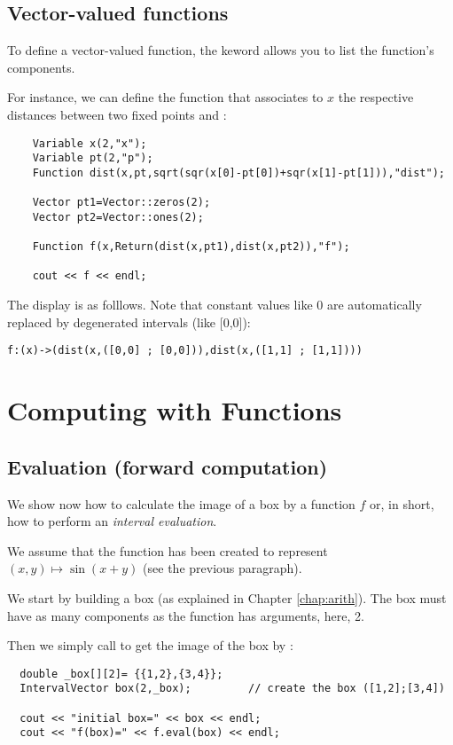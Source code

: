 \subsection{Vector-valued functions}

To define a vector-valued function, the  keword allows
you to list the function's components.

For instance, we can define the function that associates to $x$ the 
respective distances between two fixed points  and :

\begin{lstlisting}	
	Variable x(2,"x");
	Variable pt(2,"p");
	Function dist(x,pt,sqrt(sqr(x[0]-pt[0])+sqr(x[1]-pt[1])),"dist");

	Vector pt1=Vector::zeros(2);
	Vector pt2=Vector::ones(2);

	Function f(x,Return(dist(x,pt1),dist(x,pt2)),"f");

	cout << f << endl;
\end{lstlisting}

The display is as folllows. Note that constant values like 0 are automatically replaced
by degenerated intervals (like [0,0]):
\begin{verbatim}
f:(x)->(dist(x,([0,0] ; [0,0])),dist(x,([1,1] ; [1,1])))
\end{verbatim}

\section{Computing with Functions}

\subsection{Evaluation (forward computation)}

We show now how to calculate the image of a box by a function $f$ or, in short, how
to perform an {\it interval evaluation}.

We assume that the function  has been created to represent $(x,y)\mapsto \sin(x+y)$ (see the previous paragraph).

We start by building a box (as explained in Chapter \ref{chap:arith}).
The box must have as many components as the function has arguments, here, 2.

Then we simply call  to get the image of the box by :

\begin{lstlisting}
  double _box[][2]= {{1,2},{3,4}};
  IntervalVector box(2,_box);         // create the box ([1,2];[3,4])

  cout << "initial box=" << box << endl;
  cout << "f(box)=" << f.eval(box) << endl; 
\end{lstlisting}

